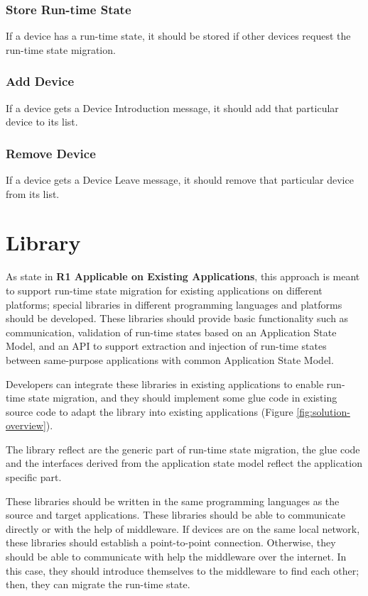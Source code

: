 \subsubsection{Store Run-time State}
If a device has a run-time state, it should be stored if other devices request the run-time state migration.

\subsubsection{Add Device}
If a device gets a Device Introduction message, it should add that particular device to its list.

\subsubsection{Remove Device}
If a device gets a Device Leave message, it should remove that particular device from its list.

\section{Library}
As state in \textbf{R1 Applicable on Existing Applications}, this approach is meant to support run-time state migration for existing applications on different platforms; special libraries in different programming languages and platforms should be developed. 
These libraries should provide basic functionality such as communication, validation of run-time states based on an Application State Model, and an API to support extraction and injection of run-time states between same-purpose applications with common Application State Model.

Developers can integrate these libraries in existing applications to enable run-time state migration, and they should implement some glue code in existing source code to adapt the library into existing applications (Figure \ref{fig:solution-overview}).

The library reflect are the generic part of run-time state migration, the glue code and the interfaces derived from the application state model reflect the application specific part.

These libraries should be written in the same programming languages as the source and target applications. These libraries should be able to communicate directly or with the help of middleware.
If devices are on the same local network, these libraries should establish a point-to-point connection.
Otherwise, they should be able to communicate with help the middleware over the internet.
In this case, they should introduce themselves to the middleware to find each other; then, they can migrate the run-time state.


